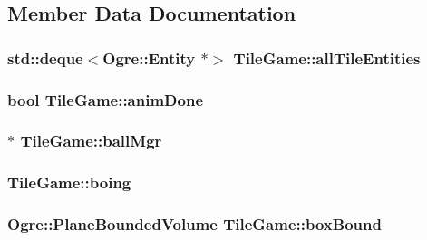 \subsection{Member Data Documentation}
\hypertarget{classTileGame_a0308b658e89712b0dfbe5998495f9cec}{
\subsubsection[{all\-Tile\-Entities}]{\setlength{\rightskip}{0pt plus 5cm}std\-::deque$<$Ogre\-::\-Entity $\ast$$>$ Tile\-Game\-::all\-Tile\-Entities\hspace{0.3cm}{\ttfamily [protected]}}}\label{classTileGame_a0308b658e89712b0dfbe5998495f9cec}
\hypertarget{classTileGame_abdd2197b16e59e2035984882aaebf9e3}{
\subsubsection[{anim\-Done}]{\setlength{\rightskip}{0pt plus 5cm}bool Tile\-Game\-::anim\-Done\hspace{0.3cm}{\ttfamily [protected]}}}\label{classTileGame_abdd2197b16e59e2035984882aaebf9e3}
\hypertarget{classTileGame_a7fe1ce6963e7ac2bd5022e653368c0ed}{
\subsubsection[{ball\-Mgr}]{$\ast$ Tile\-Game\-::ball\-Mgr\hspace{0.3cm}{\ttfamily [protected]}}}\label{classTileGame_a7fe1ce6963e7ac2bd5022e653368c0ed}
\hypertarget{classTileGame_a796c40847db5cd687417574064fbd90d}{
\subsubsection[{boing}]{ Tile\-Game\-::boing\hspace{0.3cm}{\ttfamily [protected]}}}\label{classTileGame_a796c40847db5cd687417574064fbd90d}
\hypertarget{classTileGame_a421f8bc0f90cf4acfa209bef5447e5eb}{
\subsubsection[{box\-Bound}]{\setlength{\rightskip}{0pt plus 5cm}Ogre\-::\-Plane\-Bounded\-Volume Tile\-Game\-::box\-Bound\hspace{0.3cm}{\ttfamily [protected]}}}\label{classTileGame_a421f8bc0f90cf4acfa209bef5447e5eb}
